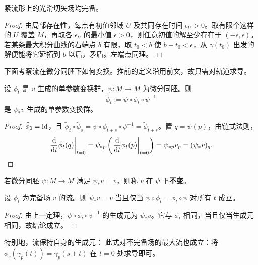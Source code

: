 \begin{theorem}
    紧流形上的光滑切矢场均完备。
\end{theorem}
\begin{proof}
    由局部存在性，每点有初值邻域 $U$ 及共同存在时间 $\epsilon_U>0$。取有限个这样的 $U$ 覆盖 $M$，再取各 $\epsilon_U$ 的最小值 $\epsilon>0$，则任意初值的解至少存在于 $(-\epsilon,\epsilon)$。若某条最大积分曲线的右端点 $b$ 有限，取 $t_0<b$ 使 $b-t_0<\epsilon$，从 $\gamma(t_0)$ 出发的解便能将它延拓到 $b$ 以后，矛盾。左端点同理。
\end{proof}

下面考察流在微分同胚下如何变换。推前的定义沿用前文，故只需对轨道求导。
\begin{theorem}\label{chdm:thm_1PDG-diff}
    设 $\phi_t$ 是 $v$ 生成的单参数变换群，$\psi:M\to M$ 为微分同胚。则
    \[
        \tilde\phi_t:=\psi\circ\phi_t\circ\psi^{-1}
    \]
    是 $\psi_*v$ 生成的单参数变换群。
\end{theorem}
\begin{proof}
    $\tilde\phi_0=\mathrm{id}$，且 $\tilde\phi_t\circ\tilde\phi_s=\psi\circ\phi_{t+s}\circ\psi^{-1}=\tilde\phi_{t+s}$。置 $q=\psi(p)$，由链式法则，
    \[
        \left.\frac{\dd}{\dd t}\tilde\phi_t(q)\right|_{t=0}
        =\psi_{*p}\left(\left.\frac{\dd}{\dd t}\phi_t(p)\right|_{t=0}\right)
        =\psi_{*p}v_p=(\psi_*v)_q.
    \]
\end{proof}

\begin{definition}
    若微分同胚 $\psi:M\to M$ 满足 $\psi_*v=v$，则称 $v$ 在 $\psi$ 下\textbf{不变}。
\end{definition}

\begin{proposition}\label{chdm:thm_ivf}
    设 $\phi_t$ 为完备场 $v$ 的流。则 $\psi_*v=v$ 当且仅当 $\psi\circ\phi_t=\phi_t\circ\psi$ 对所有 $t$ 成立。
\end{proposition}
\begin{proof}
    由上一定理，$\psi\circ\phi_t\circ\psi^{-1}$ 的生成元为 $\psi_*v$。它与 $\phi_t$ 相同，当且仅当生成元相同，故结论成立。
\end{proof}

特别地，流保持自身的生成元：
此式对不完备场的最大流也成立：将 $\phi_s(\gamma_p(t))=\gamma_p(s+t)$ 在 $t=0$ 处求导即可。

